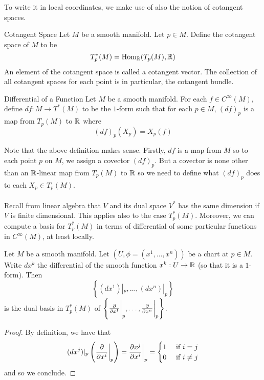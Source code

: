 \documentclass[a4paper]{article}
\begin{document}
To write it in local coordinates, we make use of also the notion of cotangent spaces. 

\begin{defn}{Cotangent Space}{} Let $M$ be a smooth manifold. Let $p\in M$. Define the cotangent space of $M$ to be $$T_p^\ast(M)=\operatorname{Hom}_{\mathbb{R}}(T_p(M),\mathbb{R})$$ An element of the cotangent space is called a cotangent vector. The collection of all cotangent spaces for each point is in particular, the cotangent bundle. 
\end{defn}

\begin{defn}{Differential of a Function}{} Let $M$ be a smooth manifold. For each $f\in C^\infty(M)$, define $df:M\to T^\ast(M)$ to be the $1$-form such that for each $p\in M$, $(df)_p$ is a map from $T_p(M)$ to $\mathbb{R}$ where $$(df)_p(X_p)=X_p(f)$$
\end{defn}

Note that the above definition makes sense. Firstly, $df$ is a map from $M$ so to each point $p$ on $M$, we assign a covector $(df)_p$. But a covector is none other than an $\mathbb{R}$-linear map from $T_p(M)$ to $\mathbb{R}$ so we need to define what $(df)_p$ does to each $X_p\in T_p(M)$. \\~\\

Recall from linear algebra that $V$ and its dual space $V^\ast$ has the same dimension if $V$ is finite dimensional. This applies also to the case $T_p^\ast(M)$. Moreover, we can compute a basis for $T_p^\ast(M)$ in terms of differential of some particular functions in $C^\infty(M)$, at least locally. 

\begin{prp}{}{} Let $M$ be a smooth manifold. Let $(U,\phi=(x^1,\dots,x^n))$ be a chart at $p\in M$. Write $dx^k$ the differential of the smooth function $x^k:U\to\mathbb{R}$ (so that it is a $1$-form). Then $$\left\{(dx^1)|_p,\dots,(dx^n)|_p\right\}$$ is the dual basis in $T_p^\ast(M)$ of $\left\{\frac{\partial}{\partial x^1}\bigg\vert_p,\dots,\frac{\partial}{\partial x^n}\bigg{|}_p\right\}$. \tcbline
\begin{proof}
By definition, we have that $$(dx^j)|_p\left(\frac{\partial}{\partial x^i}\bigg{|}_p\right)=\frac{\partial x^j}{\partial x^i}\bigg{|}_p=\begin{cases}
1 & \text{ if } i=j\\
0 & \text{ if } i\neq j
\end{cases}$$
and so we conclude. 
\end{proof}
\end{prp}
\end{document}
